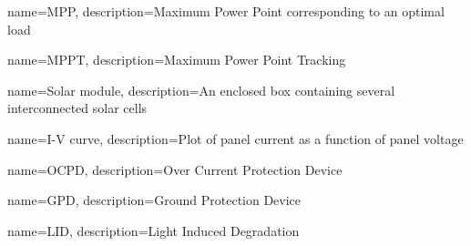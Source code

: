 {
  name=MPP,
  description={Maximum Power Point corresponding to an optimal load}
}

{
  name=MPPT,
  description={Maximum Power Point Tracking}
}

{
  name=Solar module,
  description={An enclosed box containing several interconnected solar cells}
}

{
  name=I-V curve,
  description={Plot of panel current as a function of panel voltage}
}

{
  name=OCPD,
  description={Over Current Protection Device}
}

{
  name=GPD,
  description={Ground Protection Device}
}

{
  name=LID,
  description={Light Induced Degradation}
}

\makeglossaries
\glsaddall
